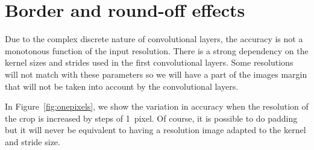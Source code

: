 \documentclass{article}
\begin{document}
\begin{table*}
\caption{\label{tab:adaptlaw}
    Matching  distribution before the last Relu  application to  ResNet-50: 
    Resulting top-1 accuracy \% on ImageNet validation set
  }  
\end{table*}


\section{Border and round-off effects}
\label{sec:roundoff}

Due to the complex discrete nature of convolutional layers, the accuracy is not a monotonous function of the input resolution. 
There is a strong dependency on the kernel sizes and strides used in the first convolutional layers. 
Some resolutions will not match with these parameters so we will have a part of the images margin that will not be taken into account by the convolutional layers. 

In Figure~\ref{fig:onepixels}, we show the variation in accuracy when the resolution of the crop is increased by steps of 1~pixel.  
Of course, it is possible to do padding but it will never be equivalent to having a resolution image adapted to the kernel and stride size.
\end{document}

